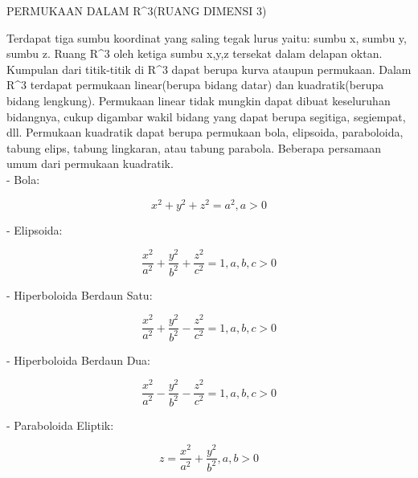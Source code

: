 \documentclass[12pt,arial,letterpaper]{book}
\begin{document}
\begin{eulercomment}
\begin{eulercomment}
\begin{eulercomment}
\begin{eulercomment}
\begin{eulercomment}
\begin{eulercomment}
\begin{eulercomment}
\begin{eulercomment}
\begin{eulercomment}
\begin{eulercomment}
\begin{eulercomment}
\begin{eulercomment}
\begin{eulercomment}
\begin{eulercomment}
\begin{eulercomment}
\begin{eulercomment}
\begin{eulercomment}
\begin{eulercomment}
\begin{eulercomment}
PERMUKAAN DALAM R\textasciicircum{}3(RUANG DIMENSI 3)

Terdapat tiga sumbu koordinat yang saling tegak lurus yaitu: sumbu x,
sumbu y, sumbu z. Ruang R\textasciicircum{}3 oleh ketiga sumbu x,y,z tersekat dalam
delapan oktan. Kumpulan dari titik-titik di R\textasciicircum{}3 dapat berupa kurva
ataupun permukaan.  Dalam R\textasciicircum{}3 terdapat permukaan linear(berupa bidang
datar) dan kuadratik(berupa bidang lengkung). Permukaan linear tidak
mungkin dapat dibuat keseluruhan bidangnya, cukup digambar wakil
bidang yang dapat berupa segitiga, segiempat, dll. Permukaan kuadratik
dapat berupa permukaan bola, elipsoida, paraboloida, tabung elips,
tabung lingkaran, atau tabung parabola. Beberapa persamaan umum dari
permukaan kuadratik.\\
- Bola:\\
\end{eulercomment}
\begin{eulerformula}
\[
x^2+y^2+z^2=a^2, a>0
\]
\end{eulerformula}
\begin{eulercomment}
- Elipsoida:\\
\end{eulercomment}
\begin{eulerformula}
\[
\frac{x^2}{a^2}+\frac{y^2}{b^2}+\frac{z^2}{c^2}=1, a,b,c>0
\]
\end{eulerformula}
\begin{eulercomment}
- Hiperboloida Berdaun Satu:\\
\end{eulercomment}
\begin{eulerformula}
\[
\frac{x^2}{a^2}+\frac{y^2}{b^2}-\frac{z^2}{c^2}=1, a,b,c>0
\]
\end{eulerformula}
\begin{eulercomment}
- Hiperboloida Berdaun Dua:\\
\end{eulercomment}
\begin{eulerformula}
\[
\frac{x^2}{a^2}-\frac{y^2}{b^2}-\frac{z^2}{c^2}=1, a,b,c>0
\]
\end{eulerformula}
\begin{eulercomment}
- Paraboloida Eliptik:\\
\end{eulercomment}
\begin{eulerformula}
\[
z=\frac{x^2}{a^2}+\frac{y^2}{b^2}, a,b>0
\]
\end{eulerformula}
\begin{eulercomment}

\end{eulercomment}
\end{eulercomment}
\end{eulercomment}
\end{eulercomment}
\end{eulercomment}
\end{eulercomment}
\end{eulercomment}
\end{eulercomment}
\end{eulercomment}
\end{eulercomment}
\end{eulercomment}
\end{eulercomment}
\end{eulercomment}
\end{eulercomment}
\end{eulercomment}
\end{eulercomment}
\end{eulercomment}
\end{eulercomment}
\end{eulercomment}
\end{document}
